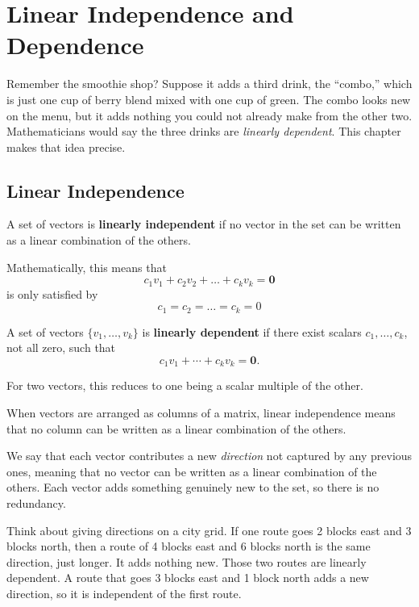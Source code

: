 \chapter{Linear Independence and Dependence}\label{chap:dependence}
Remember the smoothie shop? Suppose it adds a third drink, the ``combo,''
which is just one cup of berry blend mixed with one cup of green. The combo
looks new on the menu, but it adds nothing you could not already make
from the other two. Mathematicians would say the three drinks are
\emph{linearly dependent}. This chapter makes that idea precise.
\section{Linear Independence}
\begin{mdframed}[frametitle = {Linear Independence}, style = important]
A set of vectors is \textbf{linearly independent} if no vector in the set
can be written as a linear combination of the others.

Mathematically, this means that 
$$c_1v_1 + c_2 v_2 + \dots + c_kv_k = \mathbf{0}$$
is only satisfied by
$$c_1 = c_2 = \dots =c_k = 0$$
\end{mdframed}

\begin{mdframed}[frametitle = {Linear Dependence}, style = important]
A set of vectors $\{v_1, \dots, v_k\}$ is \textbf{linearly dependent} if there exist
scalars $c_1, \dots, c_k$, not all zero, such that
\[
c_1 v_1 + \cdots + c_k v_k = \mathbf 0.
\]

For two vectors, this reduces to one being a scalar multiple of the other.
\end{mdframed}

When vectors are arranged as columns of a matrix, linear independence means that no column can be written as a linear combination of the others.

We say that each vector contributes a new \emph{direction} not captured by any previous ones, meaning that no vector can be written as a linear combination of the others. Each vector adds something genuinely new to the set, so there is no redundancy.

Think about giving directions on a city grid. If one route goes 2 blocks east and 3 blocks north, then a route of 4 blocks east and 6 blocks north is the same direction, just longer. It adds nothing new. Those two routes are linearly dependent. A route that goes 3 blocks east and 1 block north adds a new direction, so it is independent of the first route.

